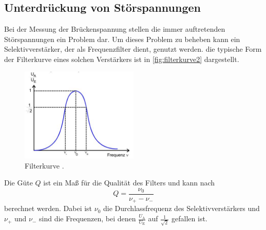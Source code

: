 \subsection{Unterdrückung von Störspannungen}
Bei der Messung der Brückenspannung stellen die immer auftretenden Störspannungen ein Problem dar. Um dieses Problem zu beheben kann ein Selektivverstärker, der als Frequenzfilter dient, genutzt werden. die typische Form der Filterkurve eines solchen Verstärkers ist in \autoref{fig:filterkurve2} dargestellt.
\begin{figure}[H]
    \centering
    \includegraphics[width=0.5\textwidth]{content/filterkurve.jpg}
    \caption{Filterkurve \cite{versuchsanleitung}.}
    \label{fig:filterkurve2}
\end{figure}
\noindent Die Güte $Q$ ist ein Maß für die Qualität des Filters und kann nach 
  \begin{equation}
    \label{eqn:güte}
    Q = \frac{\nu_0}{\nu_+ - \nu_-}
\end{equation}
berechnet werden. Dabei ist $\nu_0$ die Durchlassfrequenz des Selektivverstärkers und $\nu_+$ und $\nu_-$ sind die Frequenzen,
bei denen $\frac{U_\text{A}}{U_\text{E}}$ auf $\frac{1}{\sqrt{2}}$ gefallen ist.
